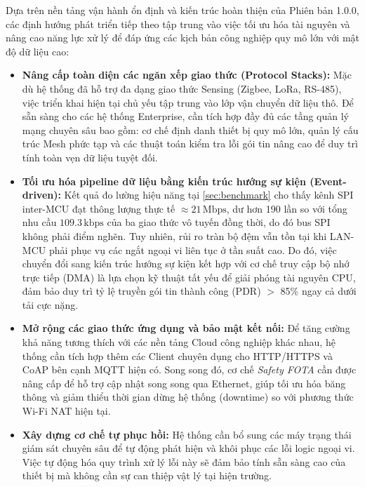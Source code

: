     Dựa trên nền tảng vận hành ổn định và kiến trúc hoàn thiện của Phiên bản 1.0.0, các định hướng phát triển tiếp theo tập trung vào việc tối ưu hóa tài nguyên và nâng cao năng lực xử lý để đáp ứng các kịch bản công nghiệp quy mô lớn với mật độ dữ liệu cao:

    \begin{itemize}
        \item \textbf{Nâng cấp toàn diện các ngăn xếp giao thức (Protocol Stacks):} Mặc dù hệ thống đã hỗ trợ đa dạng giao thức Sensing (Zigbee, LoRa, RS-485), việc triển khai hiện tại chủ yếu tập trung vào lớp vận chuyển dữ liệu thô. Để sẵn sàng cho các hệ thống Enterprise, cần tích hợp đầy đủ các tầng quản lý mạng chuyên sâu bao gồm: cơ chế định danh thiết bị quy mô lớn, quản lý cấu trúc Mesh phức tạp và các thuật toán kiểm tra lỗi gói tin nâng cao để duy trì tính toàn vẹn dữ liệu tuyệt đối.
        
        \item \textbf{Tối ưu hóa pipeline dữ liệu bằng kiến trúc hướng sự kiện (Event-driven):} Kết quả đo lường hiệu năng tại \autoref{sec:benchmark} cho thấy kênh SPI inter-MCU đạt thông lượng thực tế $\approx 21\,\text{Mbps}$, dư hơn 190 lần so với tổng nhu cầu $109{.}3\,\text{kbps}$ của ba giao thức vô tuyến đồng thời, do đó bus SPI không phải điểm nghẽn. Tuy nhiên, rủi ro tràn bộ đệm vẫn tồn tại khi LAN-MCU phải phục vụ các ngắt ngoại vi liên tục ở tần suất cao. Do đó, việc chuyển đổi sang kiến trúc hướng sự kiện kết hợp với cơ chế truy cập bộ nhớ trực tiếp (DMA) là lựa chọn kỹ thuật tất yếu để giải phóng tài nguyên CPU, đảm bảo duy trì tỷ lệ truyền gói tin thành công (PDR) $>$ 85\% ngay cả dưới tải cực nặng.
        
        \item \textbf{Mở rộng các giao thức ứng dụng và bảo mật kết nối:} Để tăng cường khả năng tương thích với các nền tảng Cloud công nghiệp khác nhau, hệ thống cần tích hợp thêm các Client chuyên dụng cho HTTP/HTTPS và CoAP bên cạnh MQTT hiện có. Song song đó, cơ chế \textit{Safety FOTA} cần được nâng cấp để hỗ trợ cập nhật song song qua Ethernet, giúp tối ưu hóa băng thông và giảm thiểu thời gian dừng hệ thống (downtime) so với phương thức Wi-Fi NAT hiện tại.
        
        \item \textbf{Xây dựng cơ chế tự phục hồi:} Hệ thống cần bổ sung các máy trạng thái giám sát chuyên sâu để tự động phát hiện và khôi phục các lỗi logic ngoại vi. Việc tự động hóa quy trình xử lý lỗi này sẽ đảm bảo tính sẵn sàng cao của thiết bị mà không cần sự can thiệp vật lý tại hiện trường.
    \end{itemize}

